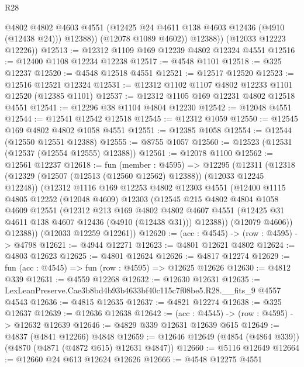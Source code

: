 \begin{lexlean}{R28}
\begin{coremodule}
                @4802
                @4802
                @4603
                @4551
                (@12425 @24 @4611 @138 @4603 @12436 (@4910 (@12438 @24)))
                @12388))
            (@12078 @1089 @4602))
          @12388))
      (@12033 @12223 @12226))
@12513 := @12312 @1109 @169 @12239 @4802 @12324 @4551
@12516 := @12400 @1108 @12234 @12238
@12517 := @4548 @1101
@12518 := @325 @12237
@12520 := @4548 @12518 @4551
@12521 := @12517 @12520
@12523 := @12516 @12521 @12324
@12531 := @12312 @1102 @1107 @4802 @12233 @1101 @12520 (@12385 @1101)
@12537 := @12312 @1105 @169 @12231 @4802 @12518 @4551
@12541 := @12296 @38 @1104 @4804 @12230
@12542 := @12048 @4551
@12544 := @12541 @12542 @12518
@12545 := @12312 @1059
@12550 := @12545 @169 @4802 @4802 @1058 @4551
@12551 := @12385 @1058
@12554 := @12544 (@12550 @12551 @12388)
@12555 := @8755 @1057
@12560 := @12523 (@12531 (@12537 (@12554 @12555) @12388))
@12561 := @12078 @1100
@12562 := @12561 @12237
@12618 := fun (member : @4595) =>
  @12295
    (@12311
      (@12318
        (@12329 (@12507 (@12513 (@12560 @12562) @12388)) (@12033 @12245 @12248))
        (@12312
          @1116
          @169
          @12253
          @4802
          @12303
          @4551
          (@12400
            @1115
            @4805
            @12252
            (@12048 @4609)
            @12303
            (@12545
              @215
              @4802
              @4804
              @1058
              @4609
              @12551
              (@12312
                @213
                @169
                @4802
                @4802
                @4607
                @4551
                (@12425 @31 @4611 @138 @4607 @12436 (@4910 (@12438 @31)))
                @12388))
            (@12079 @4606))
          @12388))
      (@12033 @12259 @12261))
@12620 := (acc : @4545) -> (row : @4595) -> @4798
@12621 := @4944 @12271
@12623 := @4801 @12621 @4802
@12624 := @4803 @12623
@12625 := @4801 @12624
@12626 := @4817 @12274
@12629 := fun (acc : @4545) => fun (row : @4595) => @12625 @12626
@12630 := @4812 @339
@12631 := @4559 @12268
@12632 := @12630 @12631
@12635 := LexLeanPreserve.Cae3b8bd4b93b4633bf40c115c7f08be5.R28.__fits_9 @4557 @4543
@12636 := @4815 @12635
@12637 := @4821 @12274
@12638 := @325 @12637
@12639 := @12636 @12638
@12642 := (acc : @4545) -> (row : @4595) -> @12632 @12639
@12646 := @4829 @339 @12631 @12639 @615
@12649 := @4837 (@4841 @12266) @4848
@12659 := @12646 @12649 (@4854 (@4864 @339)) (@4870 (@4871 (@4872 @615) @12631 @4847))
@12660 := @5116 @12649
@12664 := @12660 @24 @613 @12624 @12626
@12666 := @4548 @12275 @4551

\end{coremodule}
\end{lexlean}
